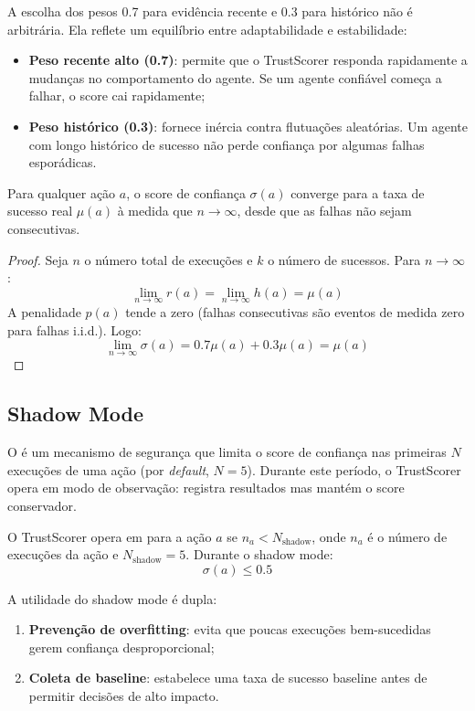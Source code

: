 A escolha dos pesos 0.7 para evidência recente e 0.3 para histórico
não é arbitrária. Ela reflete um equilíbrio entre adaptabilidade e
estabilidade:

\begin{itemize}
\item \textbf{Peso recente alto (0.7)}: permite que o TrustScorer
responda rapidamente a mudanças no comportamento do agente. Se um
agente confiável começa a falhar, o score cai rapidamente;
\item \textbf{Peso histórico (0.3)}: fornece inércia contra flutuações
aleatórias. Um agente com longo histórico de sucesso não perde
confiança por algumas falhas esporádicas.
\end{itemize}

\begin{teorema}
Para qualquer ação $a$, o score de confiança $\sigma(a)$ converge
para a taxa de sucesso real $\mu(a)$ à medida que $n \to \infty$,
desde que as falhas não sejam consecutivas.
\end{teorema}
\begin{proof}
Seja $n$ o número total de execuções e $k$ o número de sucessos.
Para $n \to \infty$:
\[
\lim_{n \to \infty} r(a) = \lim_{n \to \infty} h(a) = \mu(a)
\]
A penalidade $p(a)$ tende a zero (falhas consecutivas são eventos
de medida zero para falhas i.i.d.). Logo:
\[
\lim_{n \to \infty} \sigma(a) = 0.7 \mu(a) + 0.3 \mu(a) = \mu(a)
\]
\end{proof}

\subsection{Shadow Mode}

O  é um mecanismo de segurança que limita o
score de confiança nas primeiras $N$ execuções de uma ação (por
\emph{default}, $N = 5$). Durante este período, o TrustScorer opera
em modo de observação: registra resultados mas mantém o score
conservador.

\begin{definicao}
O TrustScorer opera em  para a ação $a$ se
$n_a < N_{\text{shadow}}$, onde $n_a$ é o número de execuções da
ação e $N_{\text{shadow}} = 5$. Durante o shadow mode:
\[
\sigma(a) \leq 0.5
\]
\end{definicao}

A utilidade do shadow mode é dupla:
\begin{enumerate}
\item \textbf{Prevenção de overfitting}: evita que poucas execuções
bem-sucedidas gerem confiança desproporcional;
\item \textbf{Coleta de baseline}: estabelece uma taxa de sucesso
baseline antes de permitir decisões de alto impacto.
\end{enumerate}


